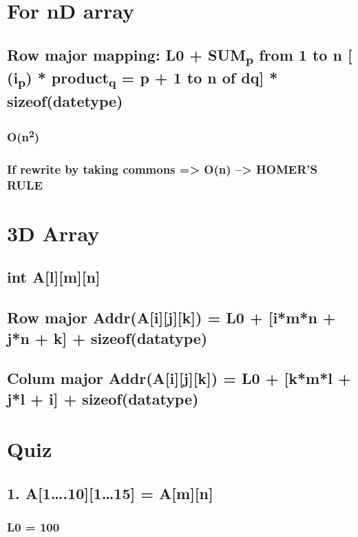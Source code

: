 \documentclass{article}
\begin{document}
\section{For nD array}
\label{sec:org3fac583}
\subsection{Row major mapping: L0 + SUM\textsubscript{p} from 1 to n [  (i\textsubscript{p}) * product\textsubscript{q} = p + 1 to n of dq] * sizeof(datetype)}
\label{sec:org2d7cd3d}
\subsubsection{O(n\textsuperscript{2})}
\label{sec:org06ca89d}
\subsubsection{If rewrite by taking commons => O(n) --> \textbf{HOMER'S RULE}}
\label{sec:orgd2f0992}
\section{3D Array}
\label{sec:org216e432}
\subsection{int A[l][m][n]}
\label{sec:org463fa20}
\subsection{Row major Addr(A[i][j][k]) = L0 + [i*m*n + j*n + k] + sizeof(datatype)}
\label{sec:orgbbcd360}
\subsection{Colum major Addr(A[i][j][k]) = L0 + [k*m*l + j*l + i] + sizeof(datatype)}
\label{sec:orgeb6225a}

\section{Quiz}
\label{sec:orgb11c417}

\subsection{1. A[1\ldots{}.10][1\ldots{}15] = A[m][n]}
\label{sec:orgc7e35eb}

\subsubsection{L0 = 100}
\label{sec:orgdaa38c8}
\end{document}
